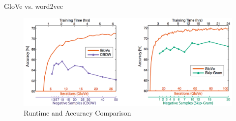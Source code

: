 \begin{frame}{GloVe vs. word2vec}
  \begin{figure}
    \centering
    \includegraphics[scale=0.29]{images/gloveVSword2vec.png}
    \caption{Runtime and Accuracy Comparison}
  \end{figure}
\end{frame}


